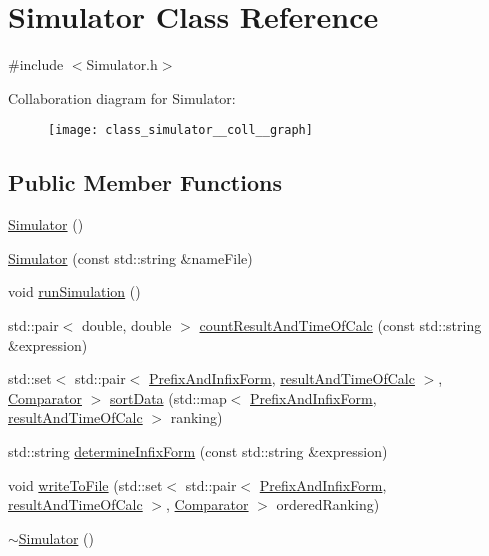 \hypertarget{class_simulator}{}\section{Simulator Class Reference}
\label{class_simulator}


{\ttfamily \#include $<$Simulator.\+h$>$}



Collaboration diagram for Simulator\+:
\nopagebreak
\begin{figure}[H]
\begin{center}
\leavevmode
\texttt{[image: class\_simulator\_\_coll\_\_graph]}
\end{center}
\end{figure}
\subsection*{Public Member Functions}
\begin{DoxyCompactItemize}
\item 
\mbox{\hyperlink{class_simulator_a031573bfcfe2e0f5c9539bcc1c7fc5d9}{Simulator}} ()
\item 
\mbox{\hyperlink{class_simulator_ab46dd711d10bc0eecc19c27210a3fc9b}{Simulator}} (const std\+::string \&name\+File)
\item 
void \mbox{\hyperlink{class_simulator_adfe488254b0356fa6e1bd3965519b73e}{run\+Simulation}} ()
\item 
std\+::pair$<$ double, double $>$ \mbox{\hyperlink{class_simulator_a1de6fe6b6a9b77968ae47a548ed53c4f}{count\+Result\+And\+Time\+Of\+Calc}} (const std\+::string \&expression)
\item 
std\+::set$<$ std\+::pair$<$ \mbox{\hyperlink{_simulator_8h_a93155c36d2ca378f207952fa62a0af6a}{Prefix\+And\+Infix\+Form}}, \mbox{\hyperlink{_simulator_8h_a0b2d4926f4b800d184280526d83a2a25}{result\+And\+Time\+Of\+Calc}} $>$, \mbox{\hyperlink{_simulator_8h_ae3c01f820fe5764de14452addf221c60}{Comparator}} $>$ \mbox{\hyperlink{class_simulator_a13dad96d60ce268556628322c8a72411}{sort\+Data}} (std\+::map$<$ \mbox{\hyperlink{_simulator_8h_a93155c36d2ca378f207952fa62a0af6a}{Prefix\+And\+Infix\+Form}}, \mbox{\hyperlink{_simulator_8h_a0b2d4926f4b800d184280526d83a2a25}{result\+And\+Time\+Of\+Calc}} $>$ ranking)
\item 
std\+::string \mbox{\hyperlink{class_simulator_a98a0ab84234ef0b0e97351fc6daf5431}{determine\+Infix\+Form}} (const std\+::string \&expression)
\item 
void \mbox{\hyperlink{class_simulator_abc52b83e17d25101a8ddd2f2215352d5}{write\+To\+File}} (std\+::set$<$ std\+::pair$<$ \mbox{\hyperlink{_simulator_8h_a93155c36d2ca378f207952fa62a0af6a}{Prefix\+And\+Infix\+Form}}, \mbox{\hyperlink{_simulator_8h_a0b2d4926f4b800d184280526d83a2a25}{result\+And\+Time\+Of\+Calc}} $>$, \mbox{\hyperlink{_simulator_8h_ae3c01f820fe5764de14452addf221c60}{Comparator}} $>$ ordered\+Ranking)
\item 
\mbox{\hyperlink{class_simulator_a0f49aa04f42060a785adf77346b9de9f}{$\sim$\+Simulator}} ()
\end{DoxyCompactItemize}


